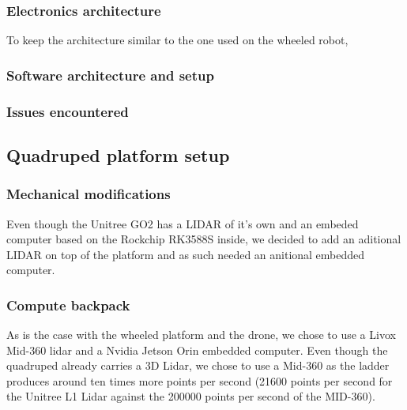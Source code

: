 \documentclass[11pt]{article}
\begin{document}
                \subsubsection{Electronics architecture}
    

                    To keep the architecture similar to the one used on the wheeled robot, 

                \subsubsection{Software architecture and setup}
    
            
                \subsubsection{Issues encountered}
                
        \subsection{Quadruped platform setup}


            \subsubsection{Mechanical modifications}

            Even though the Unitree GO2 has a LIDAR of it's own and an embeded computer based on the Rockchip RK3588S inside, we decided to add an aditional LIDAR on top of the platform and as such needed an anitional embedded computer. 

            \subsubsection{Compute backpack}


            As is the case with the wheeled platform and the drone, we chose to use a Livox Mid-360 lidar and a Nvidia Jetson Orin embedded computer. Even though the quadruped already carries a 3D Lidar, we chose to use a Mid-360 as the ladder produces around ten times more points per second (21600 points per second for the Unitree L1 Lidar against the 200000 points per second of the MID-360).
\end{document}
